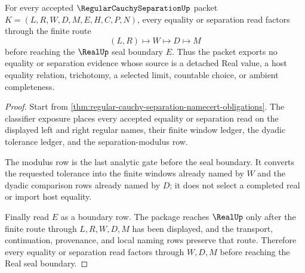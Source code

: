\begin{theorem}
\label{thm:regular-cauchy-separation-modulus-boundary}
For every accepted $\RegularCauchySeparationUp$ packet $K=(L,R,W,D,M,E,H,C,P,N)$, every equality or separation read factors through the finite route
$$
(L,R)\longmapsto W\longmapsto D\longmapsto M
$$
before reaching the $\RealUp$ seal boundary $E$. Thus the packet exports no equality or separation evidence whose source is a detached Real value, a host equality relation, trichotomy, a selected limit, countable choice, or ambient completeness.
\end{theorem}
\begin{proof}
Start from \autoref{thm:regular-cauchy-separation-namecert-obligations}. The classifier exposure places every accepted equality or separation read on the displayed left and right regular names, their finite window ledger, the dyadic tolerance ledger, and the separation-modulus row.

The modulus row is the last analytic gate before the seal boundary. It converts the requested tolerance into the finite windows already named by $W$ and the dyadic comparison rows already named by $D$; it does not select a completed real or import host equality.

Finally read $E$ as a boundary row. The package reaches $\RealUp$ only after the finite route through $L,R,W,D,M$ has been displayed, and the transport, continuation, provenance, and local naming rows preserve that route. Therefore every equality or separation read factors through $W,D,M$ before reaching the Real seal boundary.
\end{proof}


